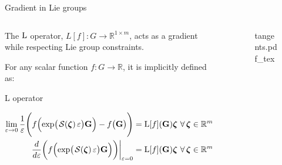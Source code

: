 \begin{frame}{Gradient in Lie groups}
\begin{columns}[c]
        \begin{column}{0.6\linewidth}
            The $\operatorname{L}$ operator, $L[f]:G\to\mathbb{R}^{1\times m}$, acts as a gradient while respecting Lie group constraints.
            \newline

            For any scalar function $f: G \to \mathbb{R}$, it is implicitly defined as:
            \begin{exampleblock}{L operator}
                {\centering $\displaystyle 
                \begin{aligned} \lim_{\varepsilon \rightarrow 0} \frac{1}{\varepsilon} \Biggl( f\Bigl(\exp\bigl(\SL[\boldsymbol{\zeta}]\varepsilon\bigr)\mathbf{G}\Bigr) - f\bigl(\mathbf{G}\bigr) \Biggr) &= \Lop[f](\mathbf{G}) \boldsymbol{\zeta} \ \forall\, \boldsymbol{\zeta} \in \mathbb{R}^m
                \\\left.\frac{d}{d\varepsilon}\biggl(f\Bigl(\exp\bigl(\SL[\boldsymbol{\zeta}]\varepsilon\bigr)\mathbf{G}\Bigr)\biggr)\right|_{\varepsilon=0} &= \Lop[f](\mathbf{G})\boldsymbol{\zeta}\ \forall\, \boldsymbol{\zeta} \in \mathbb{R}^m
                \end{aligned}$ 
                \par}%
            \end{exampleblock}
        \end{column}
        \begin{column}{0.4\linewidth}
           \begin{figure}[ht!]
                \centering
                \def\svgwidth{\linewidth}
                {\footnotesize{tangents.pdf_tex}}
            \end{figure}
        \end{column}
    \end{columns}
    
\end{frame}

